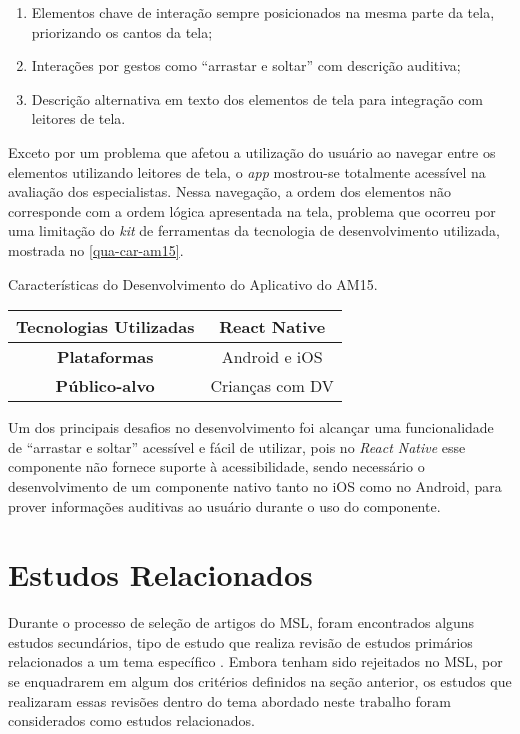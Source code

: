 \begin{enumerate}
  \item Elementos chave de interação sempre posicionados na mesma parte da tela, priorizando os cantos da tela;
  \item Interações por gestos como ``arrastar e soltar'' com descrição auditiva;
  \item Descrição alternativa em texto dos elementos de tela para integração com leitores de tela.
\end{enumerate}

Exceto por um problema que afetou a utilização do usuário ao navegar entre os elementos utilizando leitores de tela, o \emph{app}
mostrou-se totalmente acessível na avaliação dos especialistas. Nessa navegação, a ordem dos elementos não corresponde com a ordem
lógica apresentada na tela, problema que ocorreu por uma limitação do \emph{kit} de ferramentas da tecnologia de desenvolvimento
utilizada, mostrada no \autoref{qua-car-am15}.

\begin{quadro}[htb!]
  \caption{\label{qua-car-am15}Características do Desenvolvimento do Aplicativo do AM15.}
  \begin{tabular}{|c|c|}
    \hline
    \textbf{Tecnologias Utilizadas} & React Native    \\ \hline
    \textbf{Plataformas}            & Android e iOS   \\ \hline
    \textbf{Público-alvo}           & Crianças com DV \\
    \hline
  \end{tabular}
\end{quadro}

Um dos principais desafios no desenvolvimento foi alcançar uma funcionalidade de ``arrastar e soltar'' acessível e fácil de utilizar,
pois no \emph{React Native} esse componente não fornece suporte à acessibilidade, sendo necessário o desenvolvimento de um componente
nativo tanto no iOS como no Android, para prover informações auditivas ao usuário durante o uso do componente.

\section{Estudos Relacionados}

Durante o processo de seleção de artigos do MSL, foram encontrados alguns estudos secundários, tipo de estudo que realiza revisão de estudos primários
relacionados a um tema específico \cite{Kitchenham2007}. Embora tenham sido rejeitados no MSL, por se enquadrarem em algum dos critérios definidos
na seção anterior, os estudos que realizaram essas revisões dentro do tema abordado neste trabalho foram considerados como estudos relacionados.

